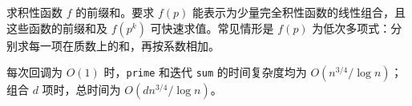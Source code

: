 求积性函数 $f$ 的前缀和。要求 $f(p)$ 能表示为少量完全积性函数的线性组合，且这些函数的前缀和及 $f(p^k)$ 可快速求值。常见情形是 $f(p)$ 为低次多项式：分别求每一项在质数上的和，再按系数相加。

每次回调为 $O(1)$ 时，\texttt{prime} 和迭代 \texttt{sum} 的时间复杂度均为 $O(n^{3/4}/\log n)$；组合 $d$ 项时，总时间为 $O(dn^{3/4}/\log n)$。
